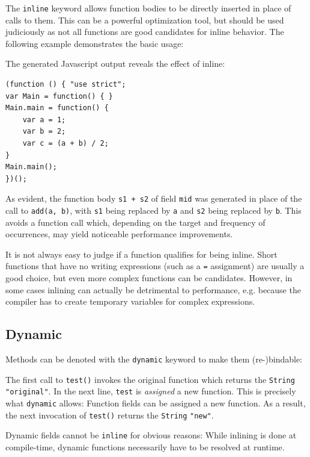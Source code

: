 \documentclass[a4paper,oneside]{book}
\newcommand{\target}[1]{#1}
\newcommand{\type}[1]{\texttt{#1}}
\newcommand{\expr}[1]{\texttt{#1}}
\newcommand{\haxe}[2][]{%
}
\begin{document}
The \expr{inline} keyword allows function bodies to be directly inserted in place of calls to them. This can be a powerful optimization tool, but should be used judiciously as not all functions are good candidates for inline behavior. The following example demonstrates the basic usage:

\haxe{assets/Inline.hx}

The generated \target{Javascript} output reveals the effect of inline:

\begin{lstlisting}
(function () { "use strict";
var Main = function() { }
Main.main = function() {
	var a = 1;
	var b = 2;
	var c = (a + b) / 2;
}
Main.main();
})();
\end{lstlisting}

As evident, the function body \expr{s1 + s2} of field \expr{mid} was generated in place of the call to \expr{add(a, b)}, with \expr{s1} being replaced by \expr{a} and \expr{s2} being replaced by \expr{b}. This avoids a function call which, depending on the target and frequency of occurrences, may yield noticeable performance improvements.

It is not always easy to judge if a function qualifies for being inline. Short functions that have no writing expressions (such as a \expr{=} assignment) are usually a good choice, but even more complex functions can be candidates. However, in some cases inlining can actually be detrimental to performance, e.g. because the compiler has to create temporary variables for complex expressions.

\subsection{Dynamic}
\label{class-field-dynamic}

Methods can be denoted with the \expr{dynamic} keyword to make them (re-)bindable:

\haxe{assets/DynamicFunction.hx}

The first call to \expr{test()} invokes the original function which returns the \type{String} \expr{"original"}. In the next line, \expr{test} is \emph{assigned} a new function. This is precisely what \expr{dynamic} allows: Function fields can be assigned a new function. As a result, the next invocation of \expr{test()} returns the \type{String} \expr{"new"}.

Dynamic fields cannot be \expr{inline} for obvious reasons: While inlining is done at compile-time, dynamic functions necessarily have to be resolved at runtime.
\end{document}
